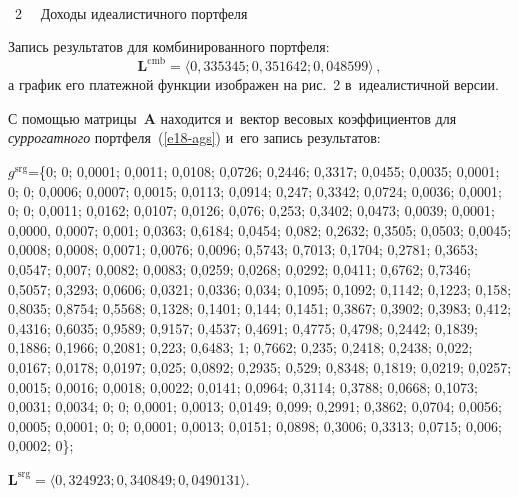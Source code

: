 \begin{multicols}{2}
\columnbreak
  
    { \begin{center}  %
 \vspace*{-2pt}
    \mbox{%
 \epsfxsize=73.463mm 
 }


\vspace*{6pt}

\noindent
{{\figurename~2}\ \ \small{
Доходы идеалистичного портфеля
}}
\end{center}}

 \vspace*{12pt} 
 
 
   Запись результатов для комбинированного портфеля: 
       $$
  \boldsymbol{L}^{\mathrm{cmb}}=\langle 0{,}335345; 0{,}351642; 0{,}048599\rangle\,, 
  $$
а график его платежной функции изображен на рис.~2 в~идеалистичной версии.
  

  С помощью матрицы~$\mathbf{A}$ находится и~вектор весовых 
коэффициентов для \textit{суррогатного} портфеля~(\ref{e18-ags}) и~его запись 
результатов: 

\vspace*{3pt}
  
  \noindent
  $g^{\mathrm{srg}}$\;=\;\{0; 0; 0,0001; 0,0011; 0,0108; 0,0726; 0,2446; 0,3317; 0,0455; 0,0035; 
0,0001; 0; 0; 0,0006; 0,0007; 0,0015; 0,0113; 0,0914; 0,247; 0,3342; 0,0724; 0,0036; 0,0001; 0; 0; 
0,0011; 0,0162; 0,0107; 0,0126; 0,076; 0,253; 0,3402; 0,0473; 0,0039; 0,0001; 0,0000, 0,0007; 
0,001; 0,0363; 0,6184; 0,0454; 0,082; 0,2632; 0,3505; 0,0503; 0,0045; 0,0008; 0,0008; 0,0071; 
0,0076; 0,0096; 0,5743; 0,7013; 0,1704; 0,2781; 0,3653; 0,0547; 0,007; 0,0082; 0,0083; 0,0259; 
0,0268; 0,0292; 0,0411; 0,6762; 0,7346; 0,5057; 0,3293; 0,0606; 0,0321; 0,0336; 0,034; 0,1095; 
0,1092; 0,1142; 0,1223; 0,158; 0,8035; 0,8754; 0,5568; 0,1328; 0,1401; 0,144; 0,1451; 0,3867; 
0,3902; 0,3983; 0,412; 0,4316; 0,6035; 0,9589; 0,9157; 0,4537; 0,4691; 0,4775; 0,4798; 0,2442; 
0,1839; 0,1886; 0,1966; 0,2081; 0,223; 0,6483; 1; 0,7662; 0,235; 0,2418; 0,2438; 0,022; 0,0167; 
0,0178; 0,0197; 0,025; 0,0892; 0,2935; 0,529; 0,8348; 0,1819; 0,0219; 0,0257; 0,0015; 0,0016; 
0,0018; 0,0022; 0,0141; 0,0964; 0,3114; 0,3788; 0,0668; 0,1073; 0,0031; 0,0034; 0; 0; 0,0001; 
0,0013; 0,0149; 0,099; 0,2991; 0,3862; 0,0704; 0,0056; 0,0005; 0,0001; 0; 0; 0,0001; 0,0013; 
0,0151; 0,0898; 0,3006; 0,3313; 0,0715; 0,006; 0,0002; 0\};

\vspace*{3pt}
  
  \noindent
  $\boldsymbol{L}^{\mathrm{srg}} = \langle 0{,}324923; 0{,}340849; 0{,}0490131\rangle$. 
  

\end{multicols}
